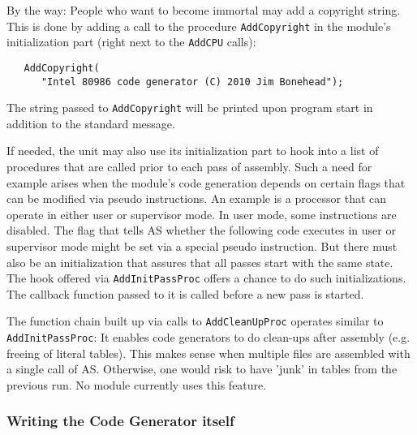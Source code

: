 \documentclass[12pt,twoside]{report}
\newcommand{\tty}[1]{{\tt #1}}
\begin{document}
By the way: People who want to become immortal may add a copyright
string.  This is done by adding a call to the procedure \tty{AddCopyright}
in the module's initialization part (right next to the \tty{AddCPU} calls):
\begin{verbatim}
   AddCopyright(
      "Intel 80986 code generator (C) 2010 Jim Bonehead");
\end{verbatim}
The string passed to \tty{AddCopyright} will be printed upon program start
in addition to the standard message.

If needed, the unit may also use its initialization part to hook into
a list of procedures that are called prior to each pass of assembly.
Such a need for example arises when the module's code generation
depends on certain flags that can be modified via pseudo
instructions.  An example is a processor that can operate in either
user or supervisor mode.  In user mode, some instructions are
disabled.  The flag that tells AS whether the following code executes
in user or supervisor mode might be set via a special pseudo
instruction.  But there must also be an initialization that assures
that all passes start with the same state.  The hook offered via
\tty{AddInitPassProc} offers a chance to do such initializations.  The
callback function passed to it is called before a new pass is
started.

The function chain built up via calls to \tty{AddCleanUpProc}
operates similar to \tty{AddInitPassProc}: It enables code
generators to do clean-ups after assembly (e.g.  freeing of
literal tables).  This makes sense when multiple files are
assembled with a single call of AS.  Otherwise, one would risk to
have 'junk' in tables from the previous run.  No module currently
uses this feature.

\subsubsection{Writing the Code Generator itself}
\end{document}
